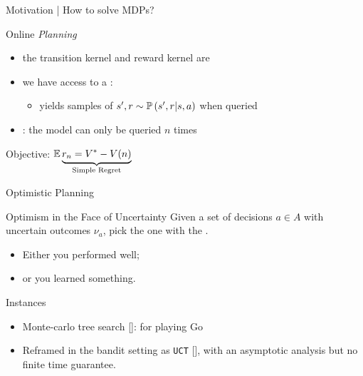 \documentclass{beamer}
\begin{document}
\begin{frame}{Motivation | How to solve MDPs?}
\begin{exampleblock}{Online \emph{Planning}}
\begin{itemize}
    \item the transition kernel and reward kernel are 
    \item we have access to a : 
    \begin{itemize}
        \item[\incarrow] yields samples of $s', r \sim \mathbb{P}\left(s',r|s,a\right)$ when queried
    \end{itemize}
    \item {}: the model can only be queried $n$ times
\end{itemize}
\begin{center}
Objective:  $\operatorname*{\mathbb{E}} \underbrace{r_n = V^* - V(n)}_{\text{Simple Regret}}$
\end{center}
\end{exampleblock}
\end{frame}


\begin{frame}{Optimistic Planning}
    
    \begin{exampleblock}{Optimism in the Face of Uncertainty}
    Given a set of decisions $a\in A$ with uncertain outcomes $\nu_a$, pick the one with the .\pause
    
    \begin{itemize}
        \item Either you performed well;\pause
        \item or you learned something.\pause
    \end{itemize}
    \end{exampleblock}
    
    \begin{block}{Instances}
    \begin{itemize}
        \item Monte-carlo tree search [\cite{Coulom2006}]: for playing Go
        \item Reframed in the bandit setting as \texttt{UCT} [\cite{Kocsis2006}], with an asymptotic analysis but no finite time guarantee.
    \end{itemize}
    \end{block}
\end{frame}
\end{document}
